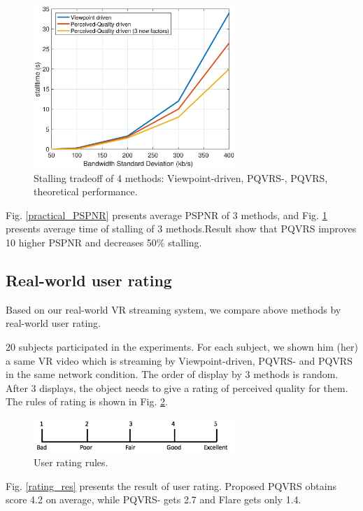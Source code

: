     \begin{figure}
  \centering
  \includegraphics[width=3in]{images/throughput-stalltime.eps}
  \caption{Stalling tradeoff of 4 methods: Viewpoint-driven, PQVRS-, PQVRS, theoretical performance.}
  \label{practical_stall}
  \end{figure}

Fig. \ref{practical_PSPNR} presents average PSPNR of 3 methods, and Fig. \ref{practical_stall} presents average time of stalling of 3 methods.Result show that PQVRS improves 10 higher PSPNR and decreases 50\% stalling.

\subsection{Real-world user rating}

Based on our real-world VR streaming system, we compare above methods by real-world user rating. 

20 subjects participated in the experiments. For each subject, we shown him (her) a same VR video which is streaming by Viewpoint-driven, PQVRS- and PQVRS in the same network condition. The order of display by 3 methods is random. After 3 displays, the object needs to give a rating of perceived quality for them. The rules of rating is shown in Fig. \ref{rating_rules}.

    \begin{figure}
  \centering
  \includegraphics[width=3in]{images/rating.jpg}
  \caption{User rating rules.}
  \label{rating_rules}
  \end{figure}

Fig. \ref{rating_res} presents the result of user rating. Proposed PQVRS obtains score 4.2 on average, while PQVRS- gets 2.7 and Flare gets only 1.4.

